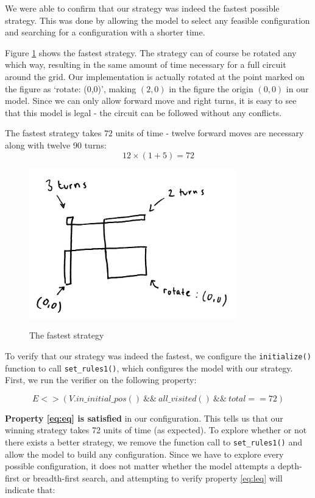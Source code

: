 \documentclass{article}
\begin{document}
We were able to confirm that our strategy was indeed the fastest possible strategy. This was done by allowing the model to select any feasible configuration and searching for a configuration with a shorter time.

Figure \ref{fig:strategy} shows the fastest strategy. The strategy can of course be rotated any which way, resulting in the same amount of time necessary for a full circuit around the grid.
Our implementation is actually rotated at the point marked on the figure as `rotate: (0,0)', making $(2,0)$ in the figure the origin $(0,0)$ in our model.
Since we can only allow forward move and right turns, it is easy to see that this model is legal
\-- the circuit can be followed without any conflicts.

The fastest strategy takes $72$ units of time \-- twelve forward moves are necessary along with twelve 90\degree{} turns:
\[ 12 \times ( 1 + 5 ) = 72 \]

\begin{figure}[h!]
	\caption{The fastest strategy}
	\centering
	\includegraphics[width=0.8\textwidth]{strategy.png}
	\label{fig:strategy}
\end{figure}

To verify that our strategy was indeed the fastest, we configure the \texttt{initialize()} function to call \texttt{set\_rules1()}, which configures the model with our strategy.
First, we run the verifier on the following property:

\begin{equation}
	\label{eq:eq}
	E<>(V.in\_initial\_pos() ~ \&\& ~ all\_visited() ~ \&\& ~ total ==  72)
\end{equation}

\textbf{Property \ref{eq:eq} is satisfied} in our configuration.
This tells us that our winning strategy takes 72 units of time (as expected).
To explore whether or not there exists a better strategy, we remove the function call to \texttt{set\_rules1()} and allow the model to build any configuration.
Since we have to explore every possible configuration, it does not matter whether the model attempts a depth-first or breadth-first search, and attempting to verify property \ref{eq:leq} will indicate that:
\end{document}
